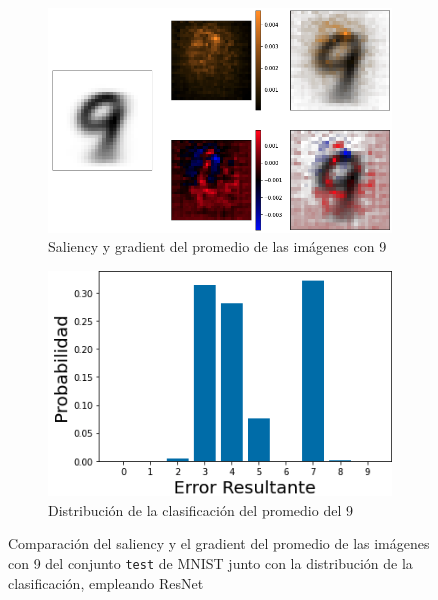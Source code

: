 \begin{figure}[h!]
    \centering
    \begin{subfigure}[b]{0.47\textwidth}
        \centering
        \includegraphics[width=\textwidth]{images/saliency/mnist/nonlinear/9_saliency_figures.png}
        \caption{Saliency y gradient del promedio de las imágenes con 9}
        \label{9_saliency_nonlin}
    \end{subfigure}
    \hfill
    \begin{subfigure}[b]{0.47\textwidth}
        \centering
        \includegraphics[width=\textwidth]{images/saliency/mnist/nonlinear/9_error.png}
        \caption{Distribución de la clasificación del promedio del 9}
        \label{9_error_nonlin}
    \end{subfigure}
    \caption{Comparación del saliency y el gradient del promedio de las imágenes con 9 del conjunto \texttt{test} de MNIST junto con la distribución de la clasificación, empleando ResNet}
    \label{9_SAL_NONLIN}
\end{figure}

